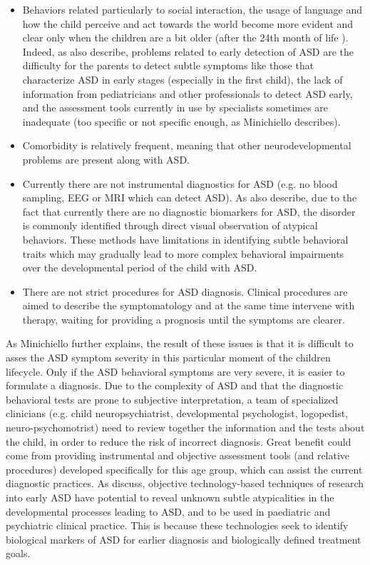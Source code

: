 \begin{itemize}
    \item Behaviors related particularly to social interaction, the usage of language and how the child perceive and act towards the world become more evident and clear only when the children are a bit older (after the 24th month of life \citep{orlandi2014advancedtools,bocchi2012earlydiagnosis}). Indeed, as also \cite{vargas2016diagnosis} describe, problems related to early detection of ASD are the difficulty for the parents to detect subtle symptoms like those that characterize ASD in early stages (especially in the first child), the lack of information from pediatricians and other professionals to detect ASD early, and the assessment tools currently in use by specialists sometimes are inadequate (too specific or not specific enough, as Minichiello describes).
    \item Comorbidity is relatively frequent, meaning that other neurodevelopmental problems are present along with ASD.
    \item Currently there are not instrumental diagnostics for ASD (e.g. no blood sampling, EEG or MRI which can detect ASD). As also \cite{samad2017markers} describe, due to the fact that currently there are no diagnostic biomarkers for ASD, the disorder is commonly identified through direct visual observation of atypical behaviors. These methods have limitations in identifying subtle behavioral traits which may gradually lead to more complex behavioral impairments over the developmental period of the child with ASD.
    \item There are not strict procedures for ASD diagnosis. Clinical procedures are aimed to describe the symptomatology and at the same time intervene with therapy, waiting for providing a prognosis until the symptoms are clearer.
\end{itemize}

As Minichiello further explains, the result of these issues is that it is difficult to asses the ASD symptom severity in this particular moment of the children lifecycle. Only if the ASD behavioral symptoms are very severe, it is easier to formulate a diagnosis. Due to the complexity of ASD and that the diagnostic behavioral tests are prone to subjective interpretation, a team of specialized clinicians (e.g. child neuropsychiatrist, developmental psychologist, logopedist, neuro-psychomotrist) need to review together the information and the tests about the child, in order to reduce the risk of incorrect diagnosis.
Great benefit could come from providing instrumental and objective assessment tools (and relative procedures) developed specifically for this age group, which can assist the current diagnostic practices. As \cite{bolte2016detection} discuss, objective technology-based techniques of research into early ASD have potential to reveal unknown subtle atypicalities in the developmental processes leading to ASD, and to be used in paediatric and psychiatric clinical practice. This is because these technologies seek to identify biological markers of ASD for earlier diagnosis and biologically defined treatment goals.


